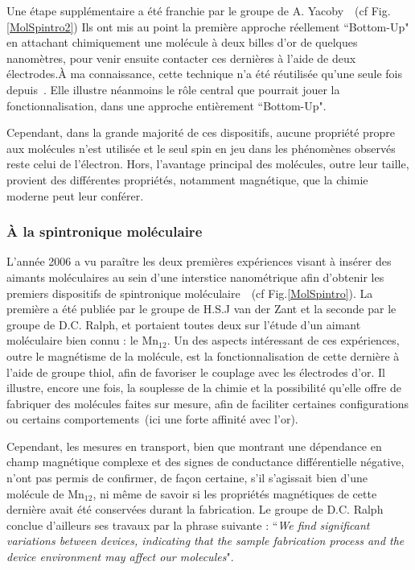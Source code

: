Une étape supplémentaire a été franchie par le groupe de A. Yacoby~\cite{Dadosh2005}~(cf Fig.\ref{MolSpintro2}) Ils ont mis au point la première approche réellement ``Bottom-Up" en attachant chimiquement une molécule à deux billes d'or de quelques nanomètres, pour venir ensuite contacter ces dernières à l'aide de deux électrodes.\`A ma connaissance, cette technique n'a été réutilisée qu'une seule fois depuis~\cite{Jain2009}. Elle illustre néanmoins le rôle central que pourrait jouer la fonctionnalisation, dans une approche entièrement ``Bottom-Up".

Cependant, dans la grande majorité de ces dispositifs, aucune propriété propre aux molécules n'est utilisée et le seul spin en jeu dans les phénomènes observés reste celui de l'électron. Hors, l'avantage principal des molécules, outre leur taille, provient des différentes propriétés, notamment magnétique, que la chimie moderne peut leur conférer.

\subsubsection*{\`A la spintronique moléculaire}

L'année 2006 a vu paraître les deux premières expériences visant à insérer des aimants moléculaires au sein d'une interstice nanométrique afin d'obtenir les premiers dispositifs de spintronique moléculaire~\cite{Heersche2006,Jo2006}~(cf Fig.\ref{MolSpintro}). La première a été publiée par le groupe de H.S.J van der Zant et la seconde par le groupe de D.C. Ralph, et portaient toutes deux sur l'étude d'un aimant moléculaire bien connu : le Mn$_{12}$. Un des aspects intéressant de ces expériences, outre le magnétisme de la molécule, est la fonctionnalisation de cette dernière à l'aide de groupe thiol, afin de favoriser le couplage avec les électrodes d'or. Il illustre, encore une fois, la souplesse de la chimie et la possibilité qu'elle offre de fabriquer des molécules faites sur mesure, afin de faciliter certaines configurations ou certains comportements~(ici une forte affinité avec l'or).  

Cependant, les mesures en transport, bien que montrant une dépendance en champ magnétique complexe et des signes de conductance différentielle négative, n'ont pas permis de confirmer, de façon certaine, s'il s'agissait bien d'une molécule de Mn$_{12}$, ni même de savoir si les propriétés magnétiques de cette dernière avait été conservées durant la fabrication. Le groupe de D.C. Ralph conclue d'ailleurs ses travaux par la phrase suivante : ``\textit{We find significant variations between devices, indicating that the sample fabrication process and the device environment may affect our molecules}".

